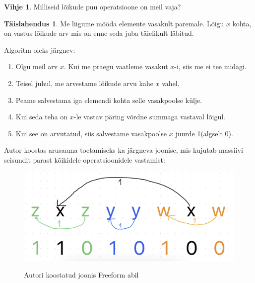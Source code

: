 \documentclass{trkut}
\theoremstyle{definition}
\newtheorem*{vihje}{Vihje}
\newtheorem*{solution}{Täislahendus}
\begin{document}
\begin{vihje}
Milliseid lõikude puu operatsioone on meil vaja?
\end{vihje}
\begin{solution}
Me liigume mööda elemente vasakult paremale.
Lõigu $x$ kohta, on vastus lõikude arv mis on enne seda juba täielikult läbitud.

Algoritm oleks järgnev:
\begin{enumerate}
\item Olgu meil arv $x$. Kui me praegu vaatleme vasakut $x$-i, siis me ei tee midagi.
\item Teisel juhul, me arvestame lõikude arvu kahe $x$ vahel. 
\item Peame salvestama iga elemendi kohta selle vasakpoolse külje.
\item Kui seda teha on $x$-le vastav päring võrdne summaga vastaval lõigul.
\item Kui see on arvutatud, siis salvestame vasakpoolse $x$ juurde 1(algselt 0).
\end{enumerate}

Autor koostas arusaama toetamiseks ka järgneva joonise, mis kujutab massiivi seisundit parast kõikidele operatsioonidele vastamist:
\begin{figure}[H]%
    \includegraphics[width=12cm]{nested.jpeg}%
    \caption{Autori koostatud joonis Freeform abil}%
    \label{joonis}%
\end{figure}
\end{solution}
\end{document}
